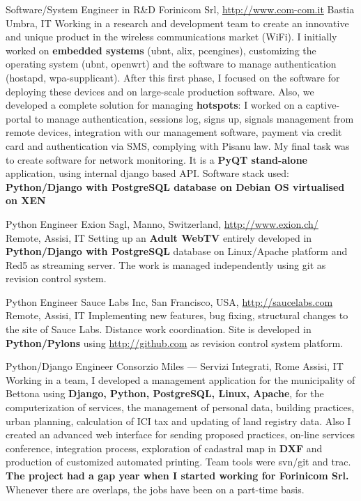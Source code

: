 \documentclass[10pt,a4paper,sans]{moderncv}
\begin{document}
    {Software/System Engineer in R\&D}
    {Forinicom Srl, \url{http://www.com-com.it}}
    {Bastia Umbra, IT}{}
    {Working in a research and development team to create an innovative and
    unique product in the wireless communications market (WiFi). I initially
    worked on \textbf{embedded systems} (ubnt, alix, pcengines), customizing
    the operating system (ubnt, openwrt) and the software to manage
    authentication (hostapd, wpa-supplicant). After this first phase, I focused
    on the software for deploying these devices and on large-scale production
    software. Also, we developed a complete solution for managing
    \textbf{hotspots}: I worked on a captive-portal to manage authentication,
    sessions log, signs up, signals management from remote devices, integration
    with our management software, payment via credit card and authentication
    via SMS, complying with Pisanu law. My final task was to create software
    for network monitoring. It is a \textbf{PyQT stand-alone} application,
    using internal django based API\@. Software stack used:
    \textbf{Python/Django with PostgreSQL database on Debian OS virtualised on
    XEN}}

    {Python Engineer}
    {Exion Sagl, Manno, Switzerland, \url{http://www.exion.ch/}}
    {Remote, Assisi, IT}{}
    {Setting up an \textbf{Adult WebTV} entirely developed in
    \textbf{Python/Django with PostgreSQL} database on Linux/Apache platform
    and Red5 as streaming server. The work is managed independently using git
    as revision control system.}

    {Python Engineer}
    {Sauce Labs Inc, San Francisco, USA, \url{http://saucelabs.com}}
    {Remote, Assisi, IT}{}
    {Implementing new features, bug fixing, structural changes to the site of
    Sauce Labs. Distance work coordination. Site is developed in
    \textbf{Python/Pylons} using \url{http://github.com} as revision control
    system platform.}

    {Python/Django Engineer}
    {Consorzio Miles --- Servizi Integrati, Rome}
    {Assisi, IT}{}
    {Working in a team, I developed a management application for the
    municipality of Bettona using \textbf{Django, Python, PostgreSQL, Linux,
    Apache}, for the computerization of services, the management of personal
    data, building practices, urban planning, calculation of ICI tax and
    updating of land registry data. Also I created an advanced web interface
    for sending proposed practices, on-line services conference, integration
    process, exploration of cadastral map in \textbf{DXF} and production of
    customized automated printing. Team tools were svn/git and trac.
    \textbf{The project had a gap year when I started working for Forinicom
    Srl.} Whenever there are overlaps, the jobs have been on a part-time
    basis.}
\end{document}
